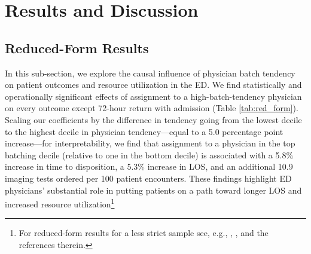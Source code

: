 \documentclass[,,blindrev]{informs}
\begin{document}
\section{Results and Discussion}\label{sec:results}

\subsection{Reduced-Form Results}\label{sec:reducedform}

In this sub-section, we explore the causal influence of physician batch
tendency on patient outcomes and resource utilization in the ED. We find
statistically and operationally significant effects of assignment to a
high-batch-tendency physician on every outcome except 72-hour return
with admission (Table \ref{tab:red_form}). Scaling our coefficients by
the difference in tendency going from the lowest decile to the highest
decile in physician tendency---equal to a 5.0 percentage point
increase---for interpretability, we find that assignment to a physician
in the top batching decile (relative to one in the bottom decile) is
associated with a 5.8\% increase in time to disposition, a 5.3\%
increase in LOS, and an additional 10.9 imaging tests ordered per 100
patient encounters. These findings highlight ED physicians' substantial
role in putting patients on a path toward longer LOS and increased
resource
utilization\footnote{For reduced-form results for a less strict sample see, e.g., \cite{jameson2024variation}, \cite{hodgson2018are}, and the references therein.}
\end{document}

